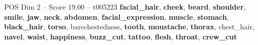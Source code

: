 \begin{textsample}{POS Dim 2 – Score 19.00 – t005223}  \label{ex:f2_pos_037}
\textbf{facial\_hair}, \textbf{cheek}, \textbf{beard}, \textbf{shoulder}, \textbf{smile}, \textbf{jaw}, \textbf{neck}, \textbf{abdomen}, \textbf{facial\_expression}, \textbf{muscle}, \textbf{stomach}, \textbf{black\_hair}, \textbf{torso}, barechestedness, \textbf{tooth}, \textbf{moustache}, \textbf{thorax}, chest\_hair, \textbf{navel}, \textbf{waist}, \textbf{happiness}, \textbf{buzz\_cut}, \textbf{tattoo}, \textbf{flesh}, \textbf{throat}, \textbf{crew\_cut}

\end{textsample}
